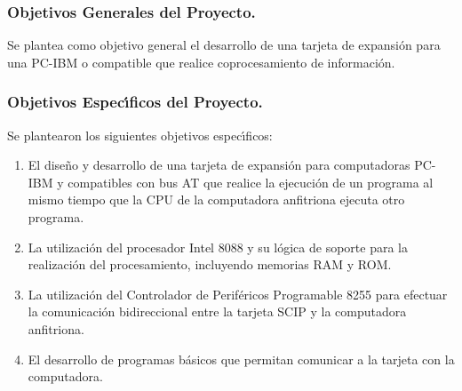 \subsubsection{Objetivos Generales del Proyecto.}
\label{Subsubsection:objetivosgenerales}

Se plantea como objetivo general el desarrollo de una tarjeta %
de expansi\'on para una PC-IBM o compatible que realice %
coprocesamiento de informaci\'on.

\subsubsection{Objetivos Espec\'{\i}ficos del Proyecto.}
\label{Subsubsection:objetivosespecificos}

Se plantearon los siguientes objetivos espec\'{\i}ficos:

\begin{enumerate}
\item El dise\~no y desarrollo de una tarjeta de %
expansi\'on para computadoras PC-IBM y compatibles con bus AT %
que realice la ejecuci\'on de un programa al mismo tiempo que %
la CPU de la computadora anfitriona ejecuta otro programa.
\item La utilizaci\'on del procesador Intel 8088 y su %
l\'ogica de soporte para la realizaci\'on del procesamiento, %
incluyendo memorias RAM y ROM.
\item La utilizaci\'on del Controlador de Perif\'ericos %
Programable 8255 para efectuar la comunicaci\'on %
bidireccional entre la tarjeta SCIP y la computadora %
anfitriona.
\item El desarrollo de programas b\'asicos que permitan %
comunicar a la tarjeta con la computadora.
\end{enumerate}

